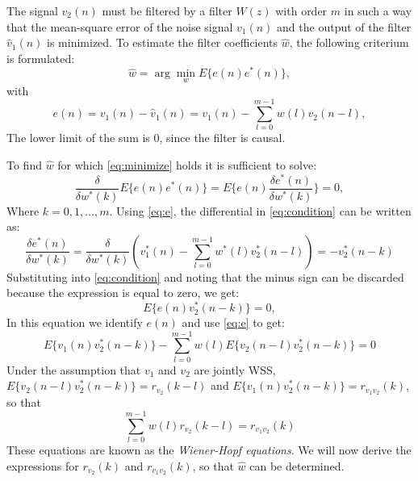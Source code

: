 \documentclass[12pt,a4paper]{article}
\begin{document}
The signal $v_2(n)$ must be filtered by a filter $W(z)$ with order $m$ in such a way that the mean-square error of the noise signal $v_1(n)$ and the output of the filter $\hat{v}_1(n)$ is minimized. To estimate the filter coefficients $\hat{w}$, the following criterium is formulated:
\begin{equation}\label{eq:minimize}
\hat{w} = \arg \min_{w} E\{e(n)e^*(n)\},
\end{equation}
with 
\begin{equation}\label{eq:e}
e(n) = v_1(n) - \hat{v}_1(n) = v_1(n) - \sum\limits_{l=0}^{m-1}w(l)v_2(n-l),
\end{equation}
The lower limit of the sum is 0, since the filter is causal.

To find $\hat{w}$ for which \autoref{eq:minimize} holds it is sufficient to solve:
\begin{equation}\label{eq:condition}
\frac{\delta}{\delta w^*(k)} E\{e(n)e^*(n)\} = E\{e(n) \frac{\delta e^*(n)}{\delta w^*(k)}\} = 0,
\end{equation}
Where $k = 0, 1, \dots, m$. Using \autoref{eq:e}, the differential in \autoref{eq:condition} can be written as: 
\begin{equation}
\frac{\delta e^*(n)}{\delta w^*(k)} = \frac{\delta}{\delta w^*(k)}\left(v^*_1(n) - \sum\limits_{l=0}^{m-1}w^*(l)v_2^*(n-l)\right) = -v_2^*(n-k)
\end{equation}
Substituting into \autoref{eq:condition} and noting that the minus sign can be discarded because the expression is equal to zero, we get:
\begin{equation}
E\{e(n)v_2^*(n-k)\} = 0,
\end{equation}
In this equation we identify $e(n)$ and use \autoref{eq:e} to get:
\begin{equation}
E\{v_1(n)v_2^*(n-k)\} - \sum\limits_{l=0}^{m-1}w(l)E\{v_2(n-l)v_2^*(n-k)\} = 0
\end{equation}
Under the assumption that $v_1$ and $v_2$ are jointly WSS, $E\{v_2(n-l)v_2^*(n-k)\} = r_{v_{2}}(k-l)$ and
$E\{v_1(n)v_2^*(n - k)\} = r_{v_{1}v_{2}}(k)$, so that
\begin{equation}
\sum\limits_{l=0}^{m-1}w(l)r_{v_{2}}(k-l) = r_{v_{1}v_{2}}(k)
\end{equation}
These equations are known as the \emph{Wiener-Hopf equations}. We will now derive the expressions for $r_{v_2}(k)$ and $r_{v_{1}v_{2}}(k)$, so that $\hat{w}$ can be determined. 
\end{document}
